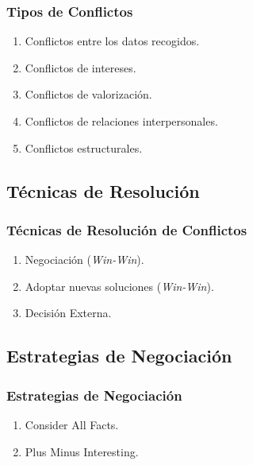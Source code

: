 \documentclass[a4paper,slidestop,xcolor=pst,dvips,blue]{beamer}
\begin{document}
\begin{frame}[c]
    \frametitle{Tipos de Conflictos}
    \begin{enumerate}[<+->]
        \item Conflictos entre los datos recogidos.
        \item Conflictos de intereses.
        \item Conflictos de valorización.
        \item Conflictos de relaciones interpersonales.
        \item Conflictos estructurales.
    \end{enumerate}
\end{frame}

\subsection{Técnicas de Resolución}

\begin{frame}[c]
    \frametitle{Técnicas de Resolución de Conflictos}
    \begin{enumerate}[<+->]
        \item Negociación (\emph{Win-Win}).
        \item Adoptar nuevas soluciones (\emph{Win-Win}).
        \item Decisión Externa.
    \end{enumerate}
\end{frame}

\subsection{Estrategias de Negociación}

\begin{frame}[c]
    \frametitle{Estrategias de Negociación}
    \begin{enumerate}
        \item Consider All Facts.
        \item Plus Minus Interesting.
    \end{enumerate}
\end{frame}
\end{document}
